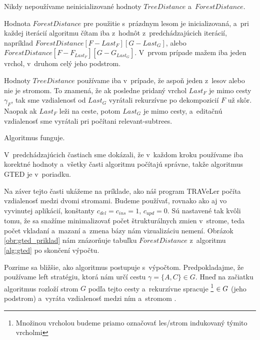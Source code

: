 \begin{lemma}
  Nikdy nepoužívame neinicializované hodnoty $TreeDistance$ a~$ForestDistance$.
\end{lemma}

\begin{dukaz}
  Hodnota $ForestDistance$ pre použitie s~prázdnym lesom je inicializovaná, a~pri každej iterácií
  algoritmu čítam iba z~hodnôt z~predchádzajúcich iterácií, napríklad
  $ForestDistance[F - Last_{F}][G - Last_{G}]$, alebo $ForestDistance[F - F_{Last_{F}}][G - G_{Last_{G}}]$.
  V~prvom prípade mažem iba jeden vrchol, v~druhom celý jeho podstrom.

  Hodnoty $TreeDistance$ používame iba v~prípade, že aspoň jeden z~lesov  alebo  nie je stromom.
  To znamená, že ak posledne pridaný vrchol $Last_{F}$ je mimo cesty $\gamma_{F}$, tak sme vzdialenosť
  od $Last_{G}$ vyrátali rekurzívne po dekompozicií $F$ už skôr.
  Naopak ak $Last_{F}$ leži na ceste, potom $Last_{G}$ je mimo cesty, a~editačnú vzdialenosť
  sme vyrátali pri počítani relevant-subtrees.
\end{dukaz}

\begin{dusl}
  Algoritmus funguje.
\end{dusl}

\begin{dukaz}
  V~predchádzajúcich častiach sme dokázali, že v~každom kroku používame iba korektné hodnoty
  a~všetky časti algoritmu počítajú správne, takže algoritmus GTED je v~poriadku.
\end{dukaz}

Na záver tejto časti ukážeme na príklade, ako náš program TRAVeLer počíta vzdialenosť
medzi dvomi stromami. Budeme používať, rovnako ako aj vo vyvinutej aplikácií,
konštanty $c_{del} = c_{ins} = 1$, $c_{upd} = 0$. Sú nastavené tak
kvôli tomu, že sa snažíme minimalizovať počet štrukturálnych zmien v~strome, teda
počet vkladaní a~mazaní a~zmena bázy nám vizualizáciu nemení.
Obrázok \ref{obr:gted_priklad} nám znázorňuje tabuľku $ForestDistance$ z~algoritmu
\ref{alg:gted} po skončení výpočtu.

Pozrime sa bližšie, ako algoritmus postupuje s~výpočtom. Predpokladajme, že
používame left stratégiu, ktorá nám určí cestu $\gamma = \{A, C\} \in G$.
Hneď na začiatku algoritmus rozloží strom $G$ podľa tejto cesty a~rekurzívne
spracuje \footnote{Množinou vrcholou budeme priamo označovať les/strom
indukovaný týmito vrcholmi} $\in G$ (jeho podstrom) a~vyráta vzdialenosť
medzi ním a~stromom .

